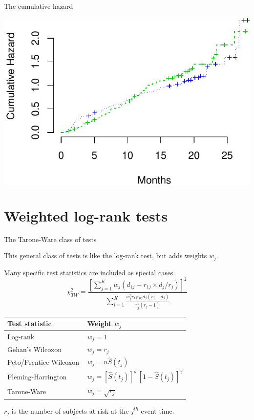 \documentclass[ignorenonframetext,]{beamer}
\begin{document}
\begin{frame}{%
\protect\hypertarget{the-cumulative-hazard}{%
The cumulative hazard}}

\includegraphics{unit_03_significance_testing_files/figure-beamer/unnamed-chunk-11-1.pdf}

\end{frame}

\hypertarget{weighted-log-rank-tests}{%
\section{Weighted log-rank tests}\label{weighted-log-rank-tests}}

\begin{frame}{%
\protect\hypertarget{the-tarone-ware-class-of-tests}{%
The Tarone-Ware class of tests}}

\small

This general class of tests is like the log-rank test, but adds weights
\({w_j}\).

Many specific test statistics are included as special cases.
\[ \chi^2_{TW} = \frac{[\sum_{j=1}^K {w_j} (d_{1j} - r_{1j} \times d_j/r_j)]^2}
        {\sum_{l=1}^K \frac{w_j^2 r_{1j}r_{0j}d_j(r_j-d_j)}{r_j^2(r_j-1)}}  \]

\begin{center}
\begin{tabular}{ll}
\hline \hline
Test statistic &  Weight ${w_j}$ \\ \hline
Log-rank              &  $w_j = 1$\\[2ex]
Gehan's Wilcoxon     &  $w_j = r_j$\\[2ex]
Peto/Prentice Wilcoxon       &  $w_j = n \widehat{S}(t_j)$\\[2ex]
Fleming-Harrington~~~~   &  $w_j=[\widehat{S}(t_j)]^\rho ~ [1-\widehat{S}(t_j)]^\gamma$\\[2ex]
Tarone-Ware          &  $w_j=\sqrt{r_j}$\\
\hline \hline
\end{tabular}
\end{center}

\(r_j\) is the number of subjects at risk at the \(j^{th}\) event time.

\end{frame}
\end{document}

